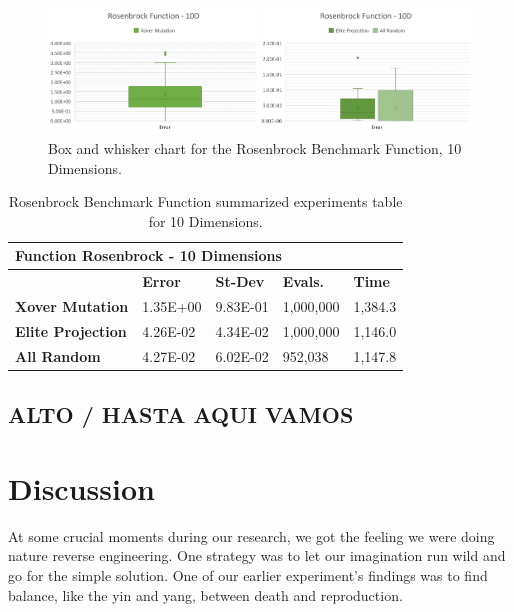 \documentclass[graybox]{svmult}
\begin{document}
    \begin{figure}
        \includegraphics[width=\linewidth, frame]{img/fig_fun_rosenbrock_10d.pdf}
        \caption{Box and whisker chart for the Rosenbrock Benchmark Function, 10 Dimensions.} \label{fig.fun_rosenbrock_10d}
        \end{figure}

    \begin{table}[]
        \scriptsize
        \centering
        \caption{Rosenbrock Benchmark Function summarized experiments table for 10 Dimensions.}\label{tab.fun_rosenbrock10}        
        \begin{tabular}{@{}lllll@{}}
        \toprule
        \multicolumn{5}{l}{\textbf{Function Rosenbrock - 10 Dimensions}} \\ \midrule
        & \textbf{Error} & \textbf{St-Dev} & \textbf{Evals.} & \textbf{Time} \\
        \textbf{Xover Mutation} & 1.35E+00 & 9.83E-01 & 1,000,000 & 1,384.3 \\
        \textbf{Elite Projection} & 4.26E-02 & 4.34E-02 & 1,000,000 & 1,146.0 \\
        \textbf{All Random} & 4.27E-02 & 6.02E-02 & 952,038 & 1,147.8 \\ \bottomrule
        \end{tabular}
        \end{table}


\subsection{ALTO / HASTA AQUI VAMOS}

\section{Discussion}
\label{section.discussion}

At some crucial moments during our research, we got the feeling we were doing
nature reverse engineering. One strategy was to let our imagination run wild
and go for the simple solution. One of our earlier experiment's findings was to
find balance, like the yin and yang, between death and reproduction.
\end{document}

